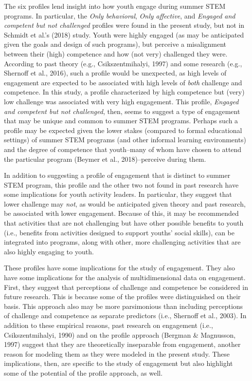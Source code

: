 \documentclass[]{msu-thesis}
\theoremstyle{definition}
\theoremstyle{definition}
\theoremstyle{definition}
\theoremstyle{remark}
\begin{document}
The six profiles lend insight into how youth engage during summer STEM
programs. In particular, the \emph{Only behavioral}, \emph{Only
affective}, and \emph{Engaged and competent but not challenged} profiles
were found in the present study, but not in Schmidt et al.'s (2018)
study. Youth were highly engaged (as may be anticipated given the goals
and design of such programs), but perceive a misalignment between their
(high) competence and how (not very) challenged they were. According to
past theory (e.g., Csikszentmihalyi, 1997) and some research (e.g.,
Shernoff et al., 2016), such a profile would be unexpected, as high
levels of engagement are expected to be associated with high levels of
\emph{both} challenge and competence. In this study, a profile
characterized by high competence but (very) low challenge was associated
with very high engagement. This profile, \emph{Engaged and competent but
not challenged}, then, seems to suggest a type of engagement that may be
unique and common to summer STEM programs. Perhaps such a profile may be
expected given the lower stakes (compared to formal educational
settings) of summer STEM programs (and other informal learning
environments) and the degree of competence that youth--many of whom have
chosen to attend the particular program (Beymer et al., 2018)--perceive
during them.

In addition to suggesting a profile of engagement that is distinct to
summer STEM program, this profile and the other two not found in past
research have some implications for youth activity leaders. In
particular, they suggest that lower challenge may \emph{not}, as would
be anticipated given theory and past research, be associated with lower
engagement. Because of this, it may be recommended that activities that
are not challenging but have other possible benefits to youth (i.e.,
benefits from activities designed to support youths' social skills), can
be integrated into programs, along with other, more challenging
activities that are also highly engaging to youth.

These profiles have some implications for the study of engagement. They
also have some implications for the analysis of multidimensional data on
engagement. First, they suggest that perceptions of challenge and
competence be considered in future research. This is because some of the
profiles were distinguished on their basis. This approach also may be
more parsimonious than including perceptions of challenge and competence
as separate predictors (i.e., Shernoff et al., 2003). In addition to
these empirical reasons, past research on engagement (i.e.,
Csikszentmihalyi, 1990) and on the profile approach (Bergman \&
Magnusson, 1997) suggest that they are theoretically inseparable from
engagement, another reason for modeling them as they were modeled in the
present study. These implications, then, are specific to the study of
engagement but also highlight some of the potential of the profile
approach, as well.
\end{document}

